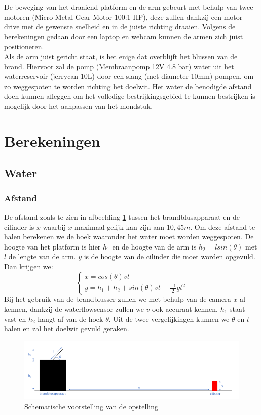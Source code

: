 \documentclass[kulak]{kulakarticle} %
\begin{document}
De beweging van het draaiend platform en de arm gebeurt met behulp van twee motoren (Micro Metal Gear Motor 100:1 HP), deze zullen dankzij een motor drive met de gewenste snelheid en in de juiste richting draaien. Volgens de berekeningen gedaan door een laptop en webcam kunnen de armen zich juist positioneren. \\

Als de arm juist gericht staat, is het enige dat overblijft het blussen van de brand. Hiervoor zal de pomp (Membraanpomp 12V 4.8 bar) water uit het waterreservoir (jerrycan 10L) door een slang (met diameter 10mm) pompen, om zo weggespoten te worden richting het doelwit. Het water de benodigde afstand doen kunnen afleggen om het volledige bestrijkingsgebied te kunnen bestrijken is mogelijk door het aanpassen van het mondstuk.


\section{Berekeningen}
\subsection{Water}
\subsubsection{Afstand}
De afstand zoals te zien in afbeelding \ref{schematische voorstelling} tussen het brandblusapparaat en de cilinder is \(x\) waarbij \(x\) maximaal gelijk kan zijn aan \(10,45 m\). Om deze afstand te halen berekenen we de hoek waaronder het water moet worden weggespoten. De hoogte van het platform is hier \(h_1\) en de hoogte van de arm is \(h_2 = lsin(\theta)\) met \(l\) de lengte van de arm. \(y\) is de hoogte van de cilinder die moet worden opgevuld. Dan krijgen we:
\begin{equation}
	\begin{cases}
		x  = cos(\theta) v t \\
		y = h_1 + h_2 + sin(\theta) v t + \frac{-1}{2} g t^2
	\end{cases}
\end{equation}
Bij het gebruik van de brandblusser zullen we met behulp van de camera \(x\) al kennen, dankzij de waterflowsensor zullen we \(v\) ook accuraat kennen, \(h_1\) staat vast en \(h_2\) hangt af van de hoek \(\theta\). Uit de twee vergelijkingen kunnen we \(\theta\) en \(t\) halen en zal het doelwit gevuld geraken.
\begin{figure} [h!]
	\centering
	\includegraphics[width = 1 \textwidth]{schematische voorstelling water LATEX}
	\caption{Schematische voorstelling van de opstelling}
	\label{schematische voorstelling}
\end{figure}
\end{document}

